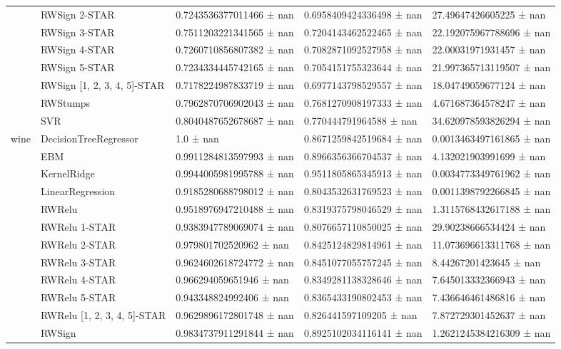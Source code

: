 \begin{tabular}{lllll}
 & RWSign 2-STAR & 0.7243536377011466 ± nan & 0.6958409424336498 ± nan & 27.49647426605225 ± nan \\
 & RWSign 3-STAR & 0.7511203221341565 ± nan & 0.7204143462522465 ± nan & 22.192075967788696 ± nan \\
 & RWSign 4-STAR & 0.7260710856807382 ± nan & 0.7082871092527958 ± nan & 22.00031971931457 ± nan \\
 & RWSign 5-STAR & 0.7234334445742165 ± nan & 0.7054151755323644 ± nan & 21.997365713119507 ± nan \\
 & RWSign [1, 2, 3, 4, 5]-STAR & 0.7178224987833719 ± nan & 0.6977143798529557 ± nan & 18.04749059677124 ± nan \\
 & RWStumps & 0.7962870706902043 ± nan & 0.7681270908197333 ± nan & 4.671687364578247 ± nan \\
 & SVR & 0.8040487652678687 ± nan & 0.770444791964588 ± nan & 34.620978593826294 ± nan \\
\cline{1-5}
\multirow[t]{20}{*}{wine} & DecisionTreeRegressor & 1.0 ± nan & 0.8671259842519684 ± nan & 0.0013463497161865 ± nan \\
 & EBM & 0.9911284813597993 ± nan & 0.8966356366704537 ± nan & 4.132021903991699 ± nan \\
 & KernelRidge & 0.9944005981995788 ± nan & 0.9511805865345913 ± nan & 0.0034773349761962 ± nan \\
 & LinearRegression & 0.9185280688798012 ± nan & 0.8043532631769523 ± nan & 0.0011398792266845 ± nan \\
 & RWRelu & 0.9518976947210488 ± nan & 0.8319375798046529 ± nan & 1.3115768432617188 ± nan \\
 & RWRelu 1-STAR & 0.9383947789069074 ± nan & 0.8076657110850025 ± nan & 29.90238666534424 ± nan \\
 & RWRelu 2-STAR & 0.979801702520962 ± nan & 0.8425124829814961 ± nan & 11.073696613311768 ± nan \\
 & RWRelu 3-STAR & 0.9624602618724772 ± nan & 0.8451077055757245 ± nan & 8.44267201423645 ± nan \\
 & RWRelu 4-STAR & 0.966294059651946 ± nan & 0.8349281138328646 ± nan & 7.645013332366943 ± nan \\
 & RWRelu 5-STAR & 0.943348824992406 ± nan & 0.8365433190802453 ± nan & 7.436646461486816 ± nan \\
 & RWRelu [1, 2, 3, 4, 5]-STAR & 0.9629896172801748 ± nan & 0.826441597109205 ± nan & 7.872729301452637 ± nan \\
 & RWSign & 0.9834737911291844 ± nan & 0.8925102034116141 ± nan & 1.2621245384216309 ± nan \\

\end{tabular}
